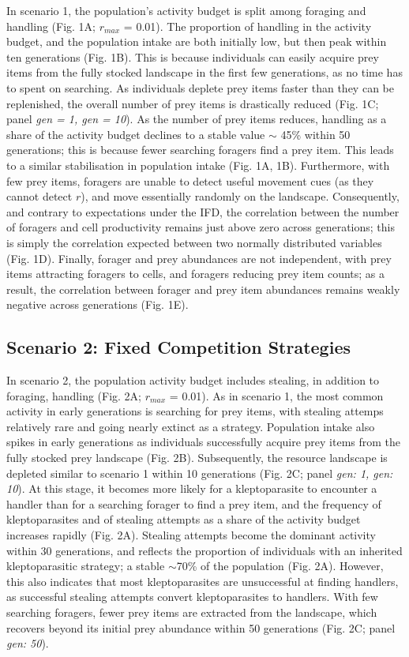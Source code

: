 \documentclass[11pt]{article}
\begin{document}
In scenario 1, the population's activity budget is split among foraging and handling (Fig. 1A; $r_{max}$ = 0.01).
The proportion of handling in the activity budget, and the population intake are both initially low, but then peak within ten generations (Fig. 1B).
This is because individuals can easily acquire prey items from the fully stocked landscape in the first few generations, as no time has to spent on searching.
As individuals deplete prey items faster than they can be replenished, the overall number of prey items is drastically reduced (Fig. 1C; panel \textit{gen = 1, gen = 10}).
As the number of prey items reduces, handling as a share of the activity budget declines to a stable value $\sim$ 45\% within 50 generations; this is because fewer searching foragers find a prey item.
This leads to a similar stabilisation in population intake (Fig. 1A, 1B).
Furthermore, with few prey items, foragers are unable to detect useful movement cues (as they cannot detect $r$), and move essentially randomly on the landscape.
Consequently, and contrary to expectations under the IFD, the correlation between the number of foragers and cell productivity remains just above zero across generations; this is simply the correlation expected between two normally distributed variables (Fig. 1D).
Finally, forager and prey abundances are not independent, with prey items attracting foragers to cells, and foragers reducing prey item counts; as a result, the correlation between forager and prey item abundances remains weakly negative across generations (Fig. 1E).

\subsection{Scenario 2: Fixed Competition Strategies}

In scenario 2, the population activity budget includes stealing, in addition to foraging, handling (Fig. 2A; $r_{max}$ = 0.01).
As in scenario 1, the most common activity in early generations is searching for prey items, with stealing attemps relatively rare and going nearly extinct as a strategy.
Population intake also spikes in early generations as individuals successfully acquire prey items from the fully stocked prey landscape (Fig. 2B).
Subsequently, the resource landscape is depleted similar to scenario 1 within 10 generations (Fig. 2C; panel \textit{gen: 1, gen: 10}).
At this stage, it becomes more likely for a kleptoparasite to encounter a handler than for a searching forager to find a prey item, and the frequency of kleptoparasites and of stealing attempts as a share of the activity budget increases rapidly (Fig. 2A).
Stealing attempts become the dominant activity within 30 generations, and reflects the proportion of individuals with an inherited kleptoparasitic strategy; a stable $\sim$70\% of the population (Fig. 2A).
However, this also indicates that most kleptoparasites are unsuccessful at finding handlers, as successful stealing attempts convert kleptoparasites to handlers.
With few searching foragers, fewer prey items are extracted from the landscape, which recovers beyond its initial prey abundance within 50 generations (Fig. 2C; panel \textit{gen: 50}).
\end{document}
